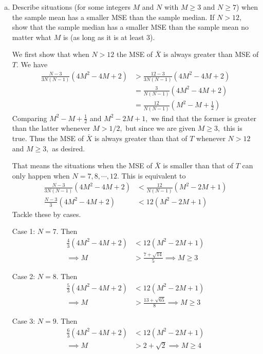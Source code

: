 \documentclass{article}
\begin{document}
\begin{enumerate}
\begin{enumerate}[(a)]
				\newpage
			\item Describe situations (for some integers $M$ and $N$ with $M\ge3$ and $N\ge7$) when the sample mean has a smaller MSE than the sample median. If $N>12,$ show that the sample median has a smaller MSE than the sample mean no matter what $M$ is (as long as it is at least 3).
				\begin{soln}
				We first show that when $N>12$ the MSE of $\bar{X}$ is always greater than MSE of $T.$ We have 
				\begin{align*}
					\frac{N-3}{3N(N-1)}(4M^2-4M+2) &> \frac{12-3}{3N(N-1)}(4M^2-4M+2) \\
					&= \frac{3}{N(N-1)}(4M^2-4M+2)\\
					&= \frac{12}{N(N-1)}\left( M^2-M+\frac{1}{2} \right)
				\end{align*} 
				Comparing $M^2-M+\frac{1}{2}$ and $M^2-2M+1,$ we find that the former is greater than the latter whenever $M>1/2,$ but since we are given $M\ge 3,$ this is true. Thus the MSE of $\bar{X}$ is always greater than that of $T$ whenever $N>12$ and $M\ge 3,$ as desired.

				That means the situations when the MSE of $\bar{X}$ is smaller than that of $T$ can only happen when $N=7, 8, \cdots, 12.$ This is equivalent to 
				\begin{align*}
					\frac{N-3}{3N(N-1)}(4M^2-4M+2) &< \frac{12}{N(N-1)}(M^2-2M+1) \\
					\frac{N-3}{3}(4M^2-4M+2) &< 12(M^2-2M+1)
				\end{align*} Tackle these by cases.

				Case 1: $N=7.$ Then
				\begin{align*}
					\frac{4}{3}(4M^2-4M+2) &< 12(M^2-2M+1) \\
					\implies M &>\frac{7+\sqrt{14}}{5} \implies M\ge3 
				\end{align*}

				Case 2: $N=8.$ Then
				\begin{align*}
					\frac{5}{3}(4M^2-4M+2) &< 12(M^2-2M+1) \\
					\implies M &> \frac{13+\sqrt{65}}{8} \implies M\ge 3 
				\end{align*} 

				Case 3: $N=9.$ Then
				\begin{align*}
					\frac{6}{3}(4M^2-4M+2) &< 12(M^2-2M+1) \\ 
					\implies M &> 2+\sqrt{2} \implies M\ge 4
				\end{align*} 


\end{soln}
\end{enumerate}
\end{enumerate}
\end{document}
